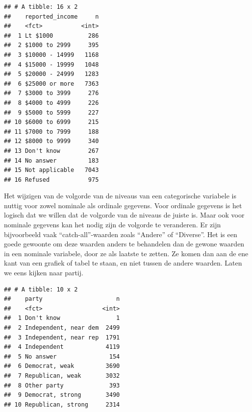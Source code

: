 \documentclass[]{tufte-book}
\newenvironment{Shaded}{}{}
\newcommand{\KeywordTok}[1]{\textcolor[rgb]{0.00,0.44,0.13}{\textbf{#1}}}
\newcommand{\NormalTok}[1]{#1}
\newcommand{\OperatorTok}[1]{\textcolor[rgb]{0.40,0.40,0.40}{#1}}
\newcommand{\StringTok}[1]{\textcolor[rgb]{0.25,0.44,0.63}{#1}}
\begin{document}
\begin{Shaded}
\end{Shaded}

\begin{verbatim}
## # A tibble: 16 x 2
##    reported_income     n
##    <fct>           <int>
##  1 Lt $1000          286
##  2 $1000 to 2999     395
##  3 $10000 - 14999   1168
##  4 $15000 - 19999   1048
##  5 $20000 - 24999   1283
##  6 $25000 or more   7363
##  7 $3000 to 3999     276
##  8 $4000 to 4999     226
##  9 $5000 to 5999     227
## 10 $6000 to 6999     215
## 11 $7000 to 7999     188
## 12 $8000 to 9999     340
## 13 Don't know        267
## 14 No answer         183
## 15 Not applicable   7043
## 16 Refused           975
\end{verbatim}

Het wijzigen van de volgorde van de niveaus van een categorische variabele is nuttig voor zowel nominale als ordinale gegevens. Voor ordinale gegevens is het logisch dat we willen dat de volgorde van de niveaus de juiste is. Maar ook voor nominale gegevens kan het nodig zijn de volgorde te veranderen. Er zijn bijvoorbeeld vaak ``catch-all''-waarden zoals ``Andere'' of ``Diverse''. Het is een goede gewoonte om deze waarden anders te behandelen dan de gewone waarden in een nominale variabele, door ze als laatste te zetten. Ze komen dan aan de ene kant van een grafiek of tabel te staan, en niet tussen de andere waarden. Laten we eens kijken naar partij.

\begin{Shaded}
\end{Shaded}

\begin{verbatim}
## # A tibble: 10 x 2
##    party                     n
##    <fct>                 <int>
##  1 Don't know                1
##  2 Independent, near dem  2499
##  3 Independent, near rep  1791
##  4 Independent            4119
##  5 No answer               154
##  6 Democrat, weak         3690
##  7 Republican, weak       3032
##  8 Other party             393
##  9 Democrat, strong       3490
## 10 Republican, strong     2314
\end{verbatim}
\end{document}
